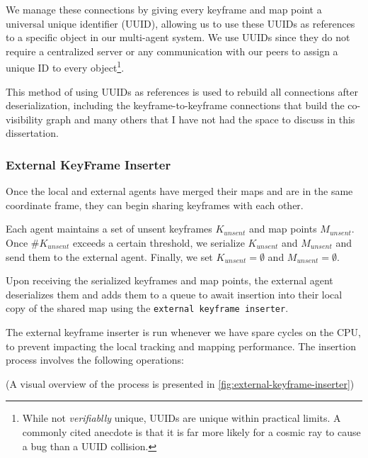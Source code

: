 We manage these connections by giving every keyframe and map point a universal unique identifier (UUID), allowing us to use these UUIDs as references to a specific object in our multi-agent system. We use UUIDs since they do not require a centralized server or any communication with our peers to assign a unique ID to every object\footnote[1]{While not \textit{verifiablly} unique, UUIDs are unique within practical limits. A commonly cited anecdote is that it is far more likely for a cosmic ray to cause a bug than a UUID collision.}.

This method of using UUIDs as references is used to rebuild all connections after deserialization, including the keyframe-to-keyframe connections that build the co-visibility graph and many others that I have not had the space to discuss in this dissertation.


\subsubsection{External KeyFrame Inserter}
\label{sec:external-key-frame-inserter}
Once the local and external agents have merged their maps and are in the same coordinate frame, they can begin sharing keyframes with each other.

Each agent maintains a set of unsent keyframes $K_{unsent}$ and map points $M_{unsent}$. Once $\#K_{unsent}$ exceeds a certain threshold, we serialize $K_{unsent}$ and $M_{unsent}$ and send them to the external agent. Finally, we set $K_{unsent} = \emptyset$ and $M_{unsent} = \emptyset$.

Upon receiving the serialized keyframes and map points, the external agent deserializes them and adds them to a queue to await insertion into their local copy of the shared map using the \texttt{external keyframe inserter}.

The external keyframe inserter is run whenever we have spare cycles on the CPU, to prevent impacting the local tracking and mapping performance. The insertion process involves the following operations:

(A visual overview of the process is presented in \autoref{fig:external-keyframe-inserter})

